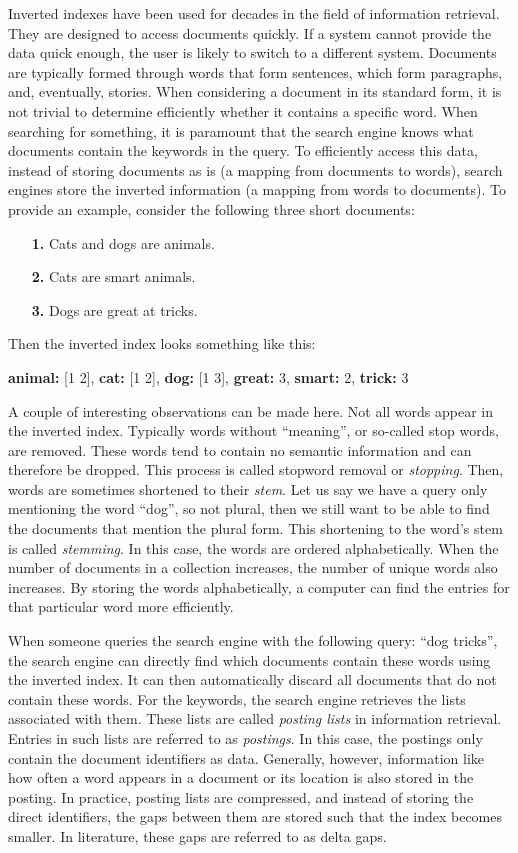 Inverted indexes have been used for decades in the field of information retrieval. They are designed to access documents quickly. If a system cannot provide the data quick enough, the user is likely to switch to a different system. Documents are typically formed through words that form sentences, which form paragraphs, and, eventually, stories. When considering a document in its standard form, it is not trivial to determine efficiently whether it contains a specific word. When searching for something, it is paramount that the search engine knows what documents contain the keywords in the query. To efficiently access this data, instead of storing documents as is (a mapping from documents to words), search engines store the inverted information (a mapping from words to documents). To provide an example, consider the following three short documents:

\begin{itemize}
	\item[\textbf{1.}] Cats and dogs are animals.
	\item[\textbf{2.}] Cats are smart animals.
	\item[\textbf{3.}] Dogs are great at tricks. 
\end{itemize}
Then the inverted index looks something like this:

\medskip
\textbf{animal:} [1 2],
\textbf{cat:} [1 2], 
\textbf{dog:} [1 3],
\textbf{great:} 3,
\textbf{smart:} 2,
\textbf{trick:} 3
\medskip

\noindent A couple of interesting observations can be made here. Not all words appear in the inverted index. Typically words without ``meaning'', or so-called stop words, are removed. These words tend to contain no semantic information and can therefore be dropped. This process is called stopword removal or \emph{stopping}. Then, words are sometimes shortened to their \emph{stem}. Let us say we have a query only mentioning the word ``dog'', so not plural, then we still want to be able to find the documents that mention the plural form. This shortening to the word's stem is called \emph{stemming}. In this case, the words are ordered alphabetically. When the number of documents in a collection increases, the number of unique words also increases. By storing the words alphabetically, a computer can find the entries for that particular word more efficiently. 

When someone queries the search engine with the following query: ``dog tricks'', the search engine can directly find which documents contain these words using the inverted index. It can then automatically discard all documents that do not contain these words.
For the keywords, the search engine retrieves the lists associated with them. These lists are called \emph{posting lists} in information retrieval. Entries in such lists are referred to as \emph{postings}. In this case, the postings only contain the document identifiers as data. Generally, however, information like how often a word appears in a document or its location is also stored in the posting. In practice, posting lists are compressed, and instead of storing the direct identifiers, the gaps between them are stored such that the index becomes smaller. In literature, these gaps are referred to as delta gaps. 

